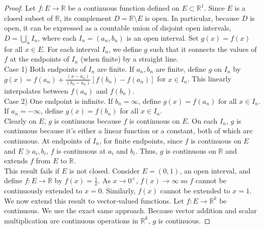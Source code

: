 \documentclass[11pt]{article}
\begin{document}
\begin{exercise}{5}
    \begin{proof}
        Let $f: E \to \mathbb{R}$ be a continuous function defined on $E \subset \mathbb{R}^1$. Since $E$ is a closed subset of $\mathbb{R}$, its complement $D = \mathbb{R} \setminus E$ is open. In particular, because $D$ is open, it can be expressed as a countable union of disjoint open intervals, $D = \bigcup_{n} I_n$, where each $I_n = (a_n, b_n)$ is an open interval. Set $g(x) = f(x)$ for all $x \in E$. For each interval $I_n$, we define $g$ such that it connects the values of $f$ at the endpoints of $I_n$ (when finite) by a straight line. \\
        Case 1) Both endpoints of $I_n$ are finite. If $a_n, b_n$ are finite, define $g$ on $I_n$ by $g(x) = f(a_n) + \frac{(x- a_n)}{(b_n - a_n)} [f(b_n) - f(a_n)]$ for $x \in I_n$. This linearly interpolates between $f(a_n)$ and $f(b_n)$. \\
        Case 2) One endpoint is infinite. If $b_n = \infty$, define $g(x) = f(a_n)$ for all $x \in I_n$. If $a_n = - \infty$, define $g(x) = f(b_n)$ for all $x \in I_n$. \\
        Clearly on $E$, $g$ is continuous because $f$ is continuous on $E$. On each $I_n$, $g$ is continuous because it's either a linear function or a constant, both of which are continuous. At endpoints of $I_n$, for finite endpoints, since \( f \) is continuous on \( E \) and \( E \ni a_i, b_i \), \( f \) is continuous at \( a_i \) and \( b_i \). Thus, $g$ is continuous on $\mathbb{R}$ and extends $f$ from $E$ to $\mathbb{R}$. \\

        This result fails if $E$ is not closed. Consider $E = (0, 1)$, an open interval, and define $f: E \to \mathbb{R}$ by $f(x) = \frac{1}{x}$. As $x \to 0^+$, $f(x) \to \infty$ so $f$ cannot be continuously extended to $x = 0$. Similarly, $f(x)$ cannot be extended to $x = 1$. \\

        We now extend this result to vector-valued functions. Let $f: E \to \mathbb{R}^k$ be continuous. We use the exact same approach. Because vector addition and scalar multiplication are continuous operations in $\mathbb{R}^k$, $g$ is continuous. 
    \end{proof}
\end{exercise}
\end{document}
